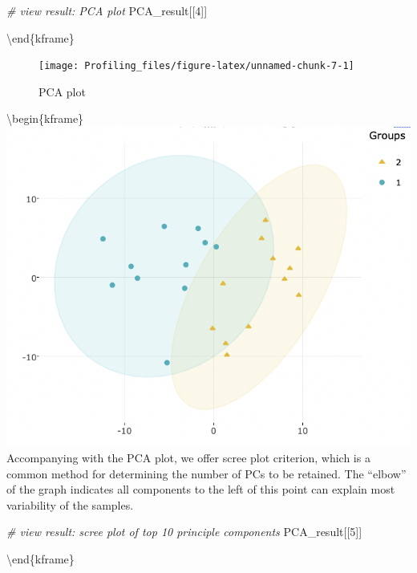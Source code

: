 \documentclass[]{article}
\newcommand{\hlnum}[1]{\textcolor[rgb]{0.816,0.125,0.439}{#1}}%
\newcommand{\hlcom}[1]{\textcolor[rgb]{0.502,0.502,0.502}{\textit{#1}}}%
\newcommand{\hlstd}[1]{\textcolor[rgb]{0.251,0.251,0.251}{#1}}%
\newenvironment{Shaded}{\begin{myshaded}}{\end{myshaded}}
\newcommand{\DecValTok}[1]{\hlnum{#1}}
\newcommand{\CommentTok}[1]{\hlcom{#1}}
\newcommand{\NormalTok}[1]{\hlstd{#1}}
\begin{document}
\begin{Shaded}
\begin{Highlighting}[]
\CommentTok{# view result: PCA plot}
\NormalTok{PCA_result[[}\DecValTok{4}\NormalTok{]]}
\end{Highlighting}
\end{Shaded}

\textbackslash end\{kframe\}

\begin{figure}

{\centering \texttt{[image: Profiling\_files/figure-latex/unnamed-chunk-7-1]}

}

\caption{PCA plot}\label{fig:unnamed-chunk-7}
\end{figure}

\textbackslash begin\{kframe\}
\includegraphics{./image/pca_biplot.png}
Accompanying with the PCA plot, we offer scree plot criterion, which is a common method for determining the number of PCs to be retained. The ``elbow'' of the graph indicates all components to the left of this point can explain most variability of the samples.

\begin{Shaded}
\begin{Highlighting}[]
\CommentTok{# view result: scree plot of top 10 principle components}
\NormalTok{PCA_result[[}\DecValTok{5}\NormalTok{]] }
\end{Highlighting}
\end{Shaded}

\textbackslash end\{kframe\}
\end{document}
